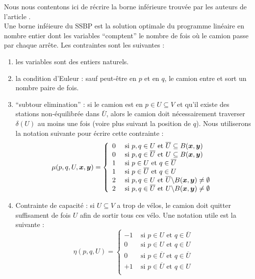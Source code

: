 \documentclass[twoside,11pt,openany,a4paper]{rapport}
\begin{document}
Nous nous contentons ici de récrire la borne inférieure trouvée par les auteurs de l'article \cite{Benchimol2011}.
\\

Une borne inféieure du SSBP est la solution optimale du programme linéaire en nombre entier dont les variables ``comptent'' le nombre de fois où le camion passe par chaque arrête. Les contraintes sont les suivantes :
\begin{enumerate}[label=(\roman*)]
\item les variables sont des entiers naturels.
\item la condition d'Euleur : sauf peut-être en $p$ et en $q$, le camion entre et sort un nombre paire de fois.
\item ``subtour elimination'' : si le camion est en $p \in U \subseteq V $ et qu'il existe des stations non-équilibrée dans $\overline{U}$, alors le camion doit nécessairement traverser $\delta(U)$ au moins une fois (voire plus suivant la position de $q$). Nous utiliserons la notation suivante pour écrire cette contrainte :
\[
\mu(p,q,U,\boldsymbol{x},\boldsymbol{y}) = \left\{
\begin{array}{ll}
  0 &\mbox{ si } p,q \in U            \mbox{ et } \overline{U} \subseteq B(\boldsymbol{x},\boldsymbol{y})\\
  0 &\mbox{ si } p,q \in \overline{U} \mbox{ et } U \subseteq B(\boldsymbol{x},\boldsymbol{y})\\
  1 &\mbox{ si } p \in U              \mbox{ et } q \in \overline{U}\\
  1 &\mbox{ si } p \in \overline{U}   \mbox{ et } q \in U\\
  2 &\mbox{ si } p,q \in U            \mbox{ et } \overline{U} \backslash B(\boldsymbol{x},\boldsymbol{y}) \ne \emptyset\\
  2 &\mbox{ si } p,q \in \overline{U} \mbox{ et } U \backslash B(\boldsymbol{x},\boldsymbol{y}) \ne \emptyset
\end{array}
\right.
\]
\item Contrainte de capacité : si $U \subseteq V$ a trop de vélos, le camion doit quitter suffisament de fois $U$ afin de sortir tous ces vélo. Une notation utile est la suivante :
\[
\eta(p,q,U) = \left\{
\begin{array}{ll}
  -1 &\mbox{ si } p \in U            \mbox{ et } q \in \overline{U}\\
  0  &\mbox{ si } p \in U            \mbox{ et } q \in U\\
  0  &\mbox{ si } p \in \overline{U} \mbox{ et } q \in \overline{U}\\
  +1 &\mbox{ si } p \in \overline{U} \mbox{ et } q \in U\\
\end{array}
\right.
\]
\end{enumerate}
\end{document}
